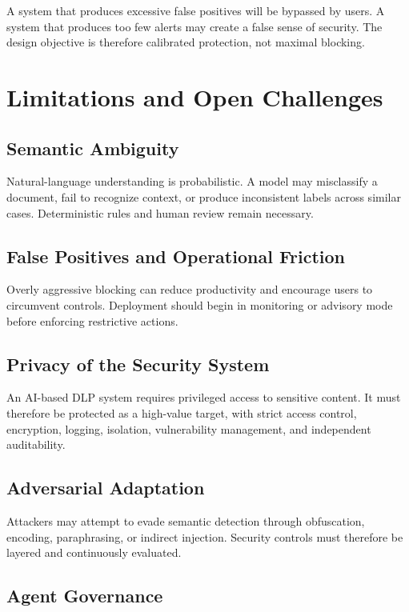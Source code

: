 \documentclass[conference]{IEEEtran}
\begin{document}
A system that produces excessive false positives will be bypassed by users. A system that produces too few alerts may create a false sense of security. The design objective is therefore calibrated protection, not maximal blocking.

\section{Limitations and Open Challenges}

\subsection{Semantic Ambiguity}

Natural-language understanding is probabilistic. A model may misclassify a document, fail to recognize context, or produce inconsistent labels across similar cases. Deterministic rules and human review remain necessary.

\subsection{False Positives and Operational Friction}

Overly aggressive blocking can reduce productivity and encourage users to circumvent controls. Deployment should begin in monitoring or advisory mode before enforcing restrictive actions.

\subsection{Privacy of the Security System}

An AI-based DLP system requires privileged access to sensitive content. It must therefore be protected as a high-value target, with strict access control, encryption, logging, isolation, vulnerability management, and independent auditability.

\subsection{Adversarial Adaptation}

Attackers may attempt to evade semantic detection through obfuscation, encoding, paraphrasing, or indirect injection. Security controls must therefore be layered and continuously evaluated.

\subsection{Agent Governance}
\end{document}
